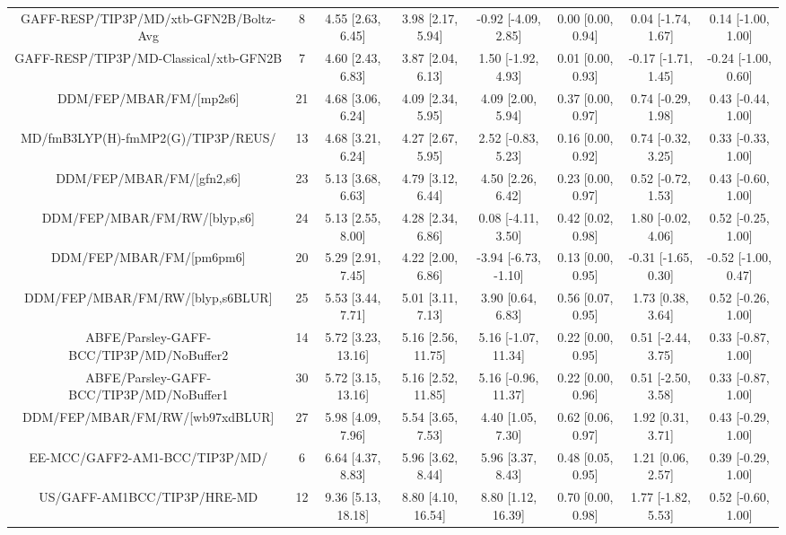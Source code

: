 \documentclass[8pt]{article}
\begin{document}
\begin{center}
\begin{footnotesize}
\begin{longtable}{|cccccccc|}
   GAFF-RESP/TIP3P/MD/xtb-GFN2B/Boltz-Avg &   8 &   4.55 [2.63, 6.45] &   3.98 [2.17, 5.94] &   -0.92 [-4.09, 2.85] &  0.00 [0.00, 0.94] &   0.04 [-1.74, 1.67] &   0.14 [-1.00, 1.00] \\
   GAFF-RESP/TIP3P/MD-Classical/xtb-GFN2B &   7 &   4.60 [2.43, 6.83] &   3.87 [2.04, 6.13] &    1.50 [-1.92, 4.93] &  0.01 [0.00, 0.93] &  -0.17 [-1.71, 1.45] &  -0.24 [-1.00, 0.60] \\
                  DDM/FEP/MBAR/FM/[mp2s6] &  21 &   4.68 [3.06, 6.24] &   4.09 [2.34, 5.95] &     4.09 [2.00, 5.94] &  0.37 [0.00, 0.97] &   0.74 [-0.29, 1.98] &   0.43 [-0.44, 1.00] \\
       MD/fmB3LYP(H)-fmMP2(G)/TIP3P/REUS/ &  13 &   4.68 [3.21, 6.24] &   4.27 [2.67, 5.95] &    2.52 [-0.83, 5.23] &  0.16 [0.00, 0.92] &   0.74 [-0.32, 3.25] &   0.33 [-0.33, 1.00] \\
                DDM/FEP/MBAR/FM/[gfn2,s6] &  23 &   5.13 [3.68, 6.63] &   4.79 [3.12, 6.44] &     4.50 [2.26, 6.42] &  0.23 [0.00, 0.97] &   0.52 [-0.72, 1.53] &   0.43 [-0.60, 1.00] \\
             DDM/FEP/MBAR/FM/RW/[blyp,s6] &  24 &   5.13 [2.55, 8.00] &   4.28 [2.34, 6.86] &    0.08 [-4.11, 3.50] &  0.42 [0.02, 0.98] &   1.80 [-0.02, 4.06] &   0.52 [-0.25, 1.00] \\
                 DDM/FEP/MBAR/FM/[pm6pm6] &  20 &   5.29 [2.91, 7.45] &   4.22 [2.00, 6.86] &  -3.94 [-6.73, -1.10] &  0.13 [0.00, 0.95] &  -0.31 [-1.65, 0.30] &  -0.52 [-1.00, 0.47] \\
         DDM/FEP/MBAR/FM/RW/[blyp,s6BLUR] &  25 &   5.53 [3.44, 7.71] &   5.01 [3.11, 7.13] &     3.90 [0.64, 6.83] &  0.56 [0.07, 0.95] &    1.73 [0.38, 3.64] &   0.52 [-0.26, 1.00] \\
 ABFE/Parsley-GAFF-BCC/TIP3P/MD/NoBuffer2 &  14 &  5.72 [3.23, 13.16] &  5.16 [2.56, 11.75] &   5.16 [-1.07, 11.34] &  0.22 [0.00, 0.95] &   0.51 [-2.44, 3.75] &   0.33 [-0.87, 1.00] \\
 ABFE/Parsley-GAFF-BCC/TIP3P/MD/NoBuffer1 &  30 &  5.72 [3.15, 13.16] &  5.16 [2.52, 11.85] &   5.16 [-0.96, 11.37] &  0.22 [0.00, 0.96] &   0.51 [-2.50, 3.58] &   0.33 [-0.87, 1.00] \\
          DDM/FEP/MBAR/FM/RW/[wb97xdBLUR] &  27 &   5.98 [4.09, 7.96] &   5.54 [3.65, 7.53] &     4.40 [1.05, 7.30] &  0.62 [0.06, 0.97] &    1.92 [0.31, 3.71] &   0.43 [-0.29, 1.00] \\
           EE-MCC/GAFF2-AM1-BCC/TIP3P/MD/ &   6 &   6.64 [4.37, 8.83] &   5.96 [3.62, 8.44] &     5.96 [3.37, 8.43] &  0.48 [0.05, 0.95] &    1.21 [0.06, 2.57] &   0.39 [-0.29, 1.00] \\
              US/GAFF-AM1BCC/TIP3P/HRE-MD &  12 &  9.36 [5.13, 18.18] &  8.80 [4.10, 16.54] &    8.80 [1.12, 16.39] &  0.70 [0.00, 0.98] &   1.77 [-1.82, 5.53] &   0.52 [-0.60, 1.00] \\
\end{longtable}
\end{footnotesize}
\end{center}
\end{document}
